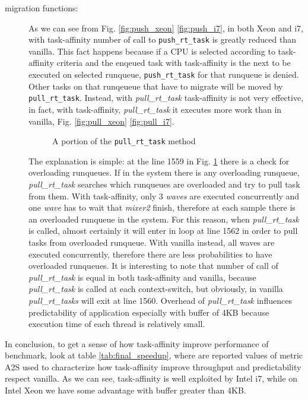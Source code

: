 \begin{description}
\item[migration functions:] As we can see from Fig. \ref{fig:push_xeon} \ref{fig:push_i7}, in both Xeon and i7, with task-affinity number of call to 
\texttt{push\_rt\_task} is greatly reduced than vanilla. This fact happens because if a CPU is selected according to task-affinity criteria and the enqeued 
task with task-affinity is the next to be executed on selected runqueue, \texttt{push\_rt\_task} for that runqueue is denied. Other tasks on that runqeueue 
that have to migrate will be moved by \texttt{pull\_rt\_task}. Instead, with \textit{pull\_rt\_task} task-affinity is not very effective, in fact, with 
task-affinity, \textit{pull\_rt\_task} it executes more work than in vanilla, Fig. \ref{fig:pull_xeon} \ref{fig:pull_i7}.

\begin{figure}[h]
  \lstset{basicstyle=\footnotesize, language=c, captionpos=b, frame=single,label=lis:steps}
  
  \label{code:pull_task_code}
  \caption{A portion of the \texttt{pull\_rt\_task} method}
\end{figure}

The explanation is simple: at the line 1559 in Fig. \ref{code:pull_task_code} there is a check for overloading runqueues. If in the system there is any 
overloading runqueue, \textit{pull\_rt\_task} searches which runqueues are overloaded and try to pull task from them. With task-affinity, only 3 
\textit{waves} are executed concurrently and one \textit{wave} has to wait that \textit{mixer2} finish, therefore at each sample there is an overloaded 
runqueue in the system. For this reason, when \textit{pull\_rt\_task} is called, almost certainly it will enter in loop at line 1562 in order to pull tasks 
from overloaded runqueue. With vanilla instead, all waves are executed concurrently, therefore there are less probabilities to have overloaded runqueues. 
It is interesting to note that number of call of \textit{pull\_rt\_task} is equal in both task-affinity and vanilla, because \textit{pull\_rt\_task} 
is called at each context-switch, but obviously, in vanilla \textit{pull\_rt\_tasks} will exit at line 1560. Overhead of \textit{pull\_rt\_task} 
influences predictability of application especially with buffer of 4KB because execution time of each thread is relatively small.

\end{description}

In conclusion, to get a sense of how task-affinity improve performance of benchmark, look at table \ref{tab:final_speedup}, where are reported values of 
metric A2S used to characterize how task-affinity improve throughput and predictability respect vanilla. As we can see, task-affinity is well exploited by
Intel i7, while on Intel Xeon we have some advantage with buffer greater than 4KB.
